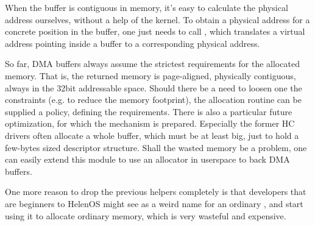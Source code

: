When the buffer is contiguous in memory, it's easy to calculate the physical
address ourselves, without a help of the kernel. To obtain a physical address
for a concrete position in the buffer, one just needs to call
, which translates a virtual address pointing inside
a buffer to a corresponding physical address.

So far, DMA buffers always assume the strictest requirements for the allocated
memory. That is, the returned memory is page-aligned, physically contiguous,
always in the 32bit addressable space. Should there be a need to loosen one the
constraints (e.g. to reduce the memory footprint), the allocation routine can
be supplied a policy, defining the requirements. There is also a particular
future optimization, for which the mechanism is prepared. Especially the former
HC drivers often allocate a whole buffer, which must be at least
 big, just to hold a few-bytes sized descriptor structure.
Shall the wasted memory be a problem, one can easily extend this module to use
an allocator in userspace to back DMA buffers.

One more reason to drop the previous  helpers completely is that
developers that are beginners to HelenOS might see  as a weird
name for an ordinary , and start using it to allocate ordinary
memory, which is very wasteful and expensive.
